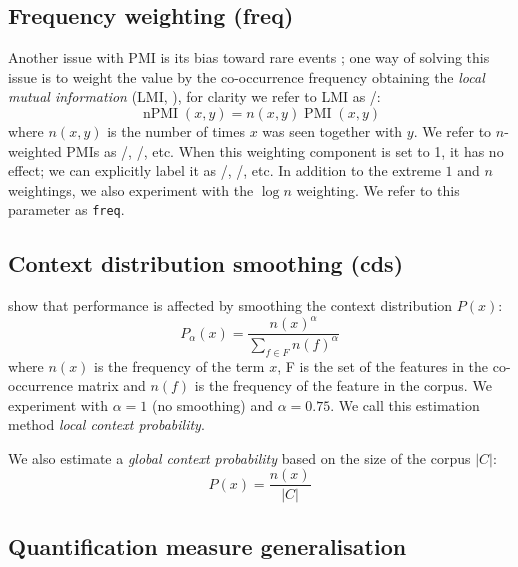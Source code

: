 \subsection{Frequency weighting (freq)}
\label{sec:frequency-weighting}

Another issue with PMI is its bias toward rare events \cite{TACL570}; one way of solving this issue is to weight the value by the co-occurrence frequency obtaining the \emph{local mutual information} (LMI, ), for clarity we refer to LMI as \NPMI/:
%
\begin{equation}
  \label{eq:lmi}
  \operatorname{nPMI}(x, y) = n(x, y)\operatorname{PMI}(x, y)
\end{equation}
%
where $n(x, y)$ is the number of times $x$ was seen together with $y$. We refer to $n$-weighted PMIs as \NPMI/, \NSPMI/, etc. When this weighting component is set to 1, it has no effect; we can explicitly label it as \PMI/, \SPMI/, etc. In addition to the extreme $1$ and $n$ weightings, we also experiment with the $\log n$ weighting. We refer to this parameter as \texttt{freq}.

\subsection{Context distribution smoothing (cds)}
\label{sec:cont-distr-smooth}

 show that performance is affected by smoothing the context distribution $P(x)$:
%
\begin{equation}
  \label{eq:cds}
  P_{\alpha}(x) = \frac{n(x)^{\alpha}}{\sum_{f \in F}n(f)^{\alpha}}
\end{equation}
where $n(x)$ is the frequency of the term $x$, F is the set of the features in the co-occurrence matrix and $n(f)$ is the frequency of the feature in the corpus. We experiment with $\alpha=1$ (no smoothing) and $\alpha = 0.75$. We call this estimation method \emph{local context probability}.

We also estimate a \emph{global context probability} based on the size of the corpus $|C|$:
%
\begin{equation}
  \label{eq:cds-nan}
  P(x) = \frac{n(x)}{|C|}
\end{equation}

\subsection{Quantification measure generalisation}
\label{sec:quantification-measures}

